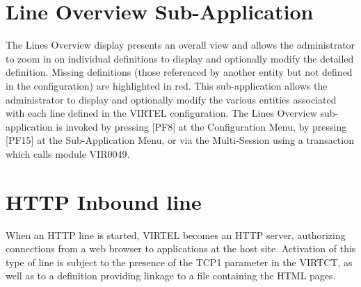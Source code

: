\documentclass[letterpaper,10pt,english]{sphinxmanual}
\begin{document}
\newpage

\ignorespaces 

\section{Line Overview Sub-Application}
\label{\detokenize{connectivity_guide:line-overview-sub-application}}\label{\detokenize{connectivity_guide:index-9}}
The Lines Overview display presents an overall view and allows the administrator to zoom in on individual definitions to display and optionally modify the detailed definition. Missing definitions (those referenced by another entity but not defined in the configuration) are highlighted in red. This sub-application allows the administrator to display and optionally modify the various entities associated with each line defined in the VIRTEL configuration. The Lines Overview sub-application is invoked by pressing {[}PF8{]} at the Configuration Menu, by pressing {[}PF15{]} at the Sub-Application Menu, or via the Multi-Session using a transaction which calls module VIR0049.


\newpage

\ignorespaces 

\section{HTTP Inbound line}
\label{\detokenize{connectivity_guide:http-inbound-line}}\label{\detokenize{connectivity_guide:index-10}}
When an HTTP line is started, VIRTEL becomes an HTTP server, authorizing connections from a web browser to applications at the host site. Activation of this type of line is subject to the presence of the TCP1 parameter in the VIRTCT, as well as to a definition providing linkage to a file containing the HTML pages.

\end{document}
